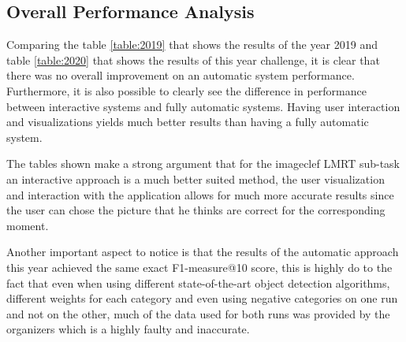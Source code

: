 \subsection{Overall Performance Analysis}

Comparing the table \ref{table:2019} that shows the results of the year 2019 and table \ref{table:2020} that shows the results of this year challenge, it is clear that there was no overall improvement on an automatic system performance. Furthermore, it is also possible to clearly see the difference in performance between interactive systems and fully automatic systems. Having user interaction and visualizations yields much better results than having a fully automatic system.

The tables shown make a strong argument that for the imageclef LMRT sub-task an interactive approach is a much better suited method, the user visualization and interaction with the application allows for much more accurate results since the user can chose the picture that he thinks are correct for the corresponding moment.

Another important aspect to notice is that the results of the automatic approach this year achieved the same exact F1-measure@10 score, this is highly do to the fact that even when using different state-of-the-art object detection algorithms, different weights for each category and even using negative categories on one run and not on the other, much of the data used for both runs was provided by the organizers which is a highly faulty and inaccurate.



